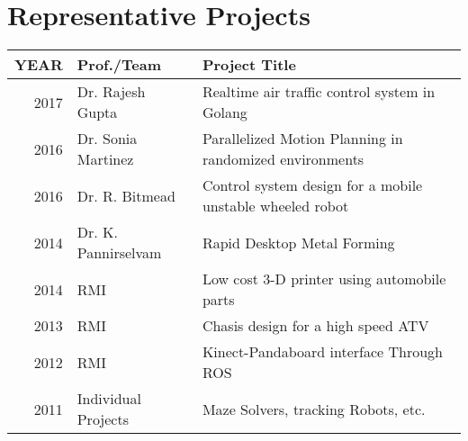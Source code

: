 \documentclass[]{deedy-resume-openfont}
\begin{document}
\begin{minipage}[t]{0.66\textwidth}
\newcommand\Topstrut{\rule{0pt}{2.1ex}}
\newcommand\Bottomstrut{\rule[-0.6ex]{0pt}{0pt}}

\section{Representative Projects}
\begin{tabular}{rll}

YEAR	     & Prof./Team  & Project Title \\
\hline
2017\rule{0pt}{3ex}	     & Dr. Rajesh Gupta & Realtime air traffic control system in Golang\\ 
2016         & Dr. Sonia Martinez & Parallelized Motion Planning in randomized environments\\
2016         &Dr. R. Bitmead & Control system design for a mobile unstable wheeled robot\\
2014	     & Dr. K. Pannirselvam  & Rapid Desktop Metal Forming\\
2014	     & RMI  & Low cost 3-D printer using automobile parts\\
2013	     & RMI & Chasis design for a high speed ATV\\
2012	     & RMI & Kinect-Pandaboard interface Through ROS\\
2011        &  Individual Projects & Maze Solvers, tracking Robots, etc.\\
\end{tabular}
\sectionsep








\end{minipage} 
\end{document}
